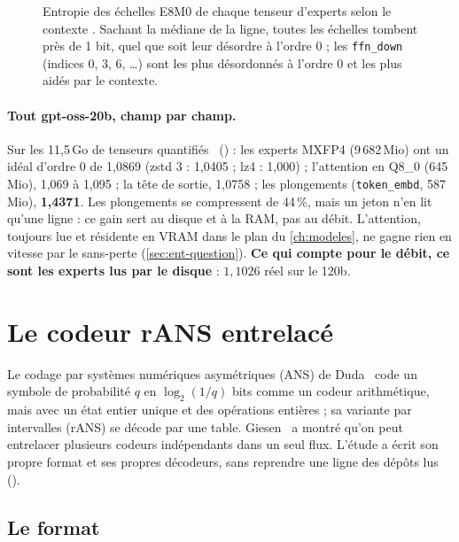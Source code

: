\begin{figure}[ht]
\centering
\GrapheEchelles
\caption[Entropie des échelles E8M0, tenseur par tenseur]{Entropie des échelles E8M0 de chaque tenseur d'experts selon le contexte \mes. Sachant la médiane de la ligne, toutes les échelles tombent près de 1 bit, quel que soit leur désordre à l'ordre 0 ; les \texttt{ffn\_down} (indices 0, 3, 6, \ldots) sont les plus désordonnés à l'ordre 0 et les plus aidés par le contexte.}
\label{fig:ent-echelles}
\end{figure}

\paragraph{Tout gpt-oss-20b, champ par champ.} Sur les 11,5\,Go de tenseurs quantifiés \mes~() : les experts MXFP4 (9\,682\,Mio) ont un idéal d'ordre 0 de 1,0869 (zstd 3 : 1,0405 ; lz4 : 1,000) ; l'attention en Q8\_0 (645\,Mio), 1,069 à 1,095 ; la tête de sortie, 1,0758 ; les plongements (\texttt{token\_embd}, 587\,Mio), \textbf{1,4371}. Les plongements se compressent de 44\,\%, mais un jeton n'en lit qu'une ligne : ce gain sert au disque et à la RAM, pas au débit. L'attention, toujours lue et résidente en VRAM dans le plan du \cref{ch:modeles}, ne gagne rien en vitesse par le sans-perte (\cref{sec:ent-question}). \textbf{Ce qui compte pour le débit, ce sont les experts lus par le disque} : $1{,}1026$ réel sur le 120b.

\section{Le codeur rANS entrelacé}\label{sec:ent-rans}

Le codage par systèmes numériques asymétriques (ANS) de Duda~\cite{duda2013ans} code un symbole de probabilité $q$ en $\log_2(1/q)$ bits comme un codeur arithmétique, mais avec un état entier unique et des opérations entières ; sa variante par intervalles (rANS) se décode par une table. Giesen~\cite{giesen2014interleaved} a montré qu'on peut entrelacer plusieurs codeurs indépendants dans un seul flux. L'étude a écrit son propre format et ses propres décodeurs, sans reprendre une ligne des dépôts lus ().

\subsection{Le format}

